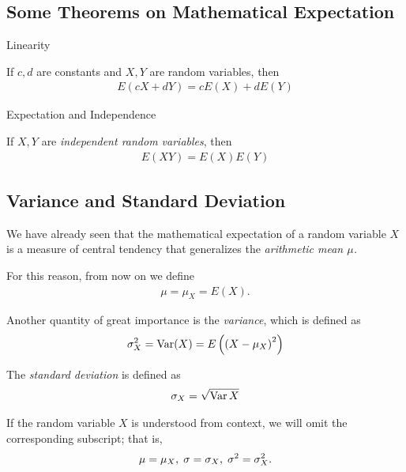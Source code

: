 \subsection{Some Theorems on Mathematical Expectation}
{Linearity}
 \begin{teorema}
  \label{thm:2.9.1}
  If $c,d$ are constants and $X,Y$ are random variables, then
  \begin{align}
   \label{eq:2.9.7}
   E\left( cX+dY \right)=
   cE\left( X \right)+dE\left( Y \right)
  \end{align}
 \end{teorema}

{Expectation and Independence}
 \begin{teorema}
  \label{thm:2.9.2} If $X,Y$ are \emph{independent random variables}, then
  \begin{align}
   \label{eq:2.9.8}
   E\left( XY \right)=E(X)E(Y)
  \end{align}
 \end{teorema}

\subsection{Variance and Standard Deviation}

 We have already seen that the mathematical expectation of a random variable $X$ is a measure of central tendency that generalizes the \emph{arithmetic mean $\mu$.}
 
\begin{observacion}
 For this reason, from now on we define
 \begin{align}
  \mu=\mu_{X}=E(X).
 \end{align}
\end{observacion}

 Another quantity of great importance is the \emph{variance}, which is defined as
 \begin{align}
  \label{eq:2.9.9}
  \sigma_{X}^{2}=\operatorname{Var}(X)=E\left( \left( X-\mu_{X} \right)^{2} \right)
 \end{align}

 The \emph{standard deviation} is defined as
 \begin{align}
  \label{eq:2.9.10}
  \sigma_{X} = \sqrt{\operatorname{Var}{X}}
 \end{align}

 \begin{observacion}
  If the random variable $X$ is understood from context, we will omit the corresponding subscript; that is,
  \begin{align}
   \mu=\mu_{X}, \; \sigma=\sigma_{X}, \; \sigma^{2}=\sigma_{X}^{2}.
  \end{align}
 \end{observacion}

